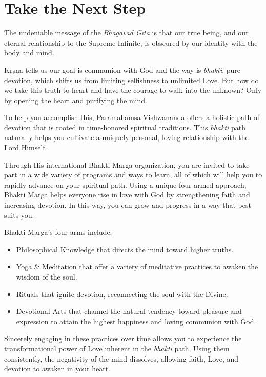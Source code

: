 \chapter*{Take the Next Step}\label{chap-take-the-next-step}

The undeniable message of the \textit{Bhagavad Gītā} is that our true being, and our eternal relationship to the Supreme Infinite, is obscured by our identity with the body and mind.

Kṛṣṇa tells us our goal is communion with God and the way is \textit{bhakti}, pure devotion, which shifts us from limiting selfishness to unlimited Love. But how do we take this truth to heart and have the courage to walk into the unknown? Only by opening the heart and purifying the mind. 

To help you accomplish this, Paramahamsa Vishwananda offers a holistic path of devotion that is rooted in time-honored spiritual traditions. This \textit{bhakti} path naturally helps you cultivate a uniquely personal, loving relationship with the Lord Himself.

Through His international Bhakti Marga organization, you are invited to take part in a wide variety of programs and ways to learn, all of which will help you to rapidly advance on your spiritual path. Using a unique four-armed approach, Bhakti Marga helps everyone rise in love with God by strengthening faith and increasing devotion. In this way, you can grow and progress in a way that best suits you.

Bhakti Marga's four arms include:
\begin{itemize}[itemsep=1pt, topsep=6pt]

\item Philosophical Knowledge that directs the
mind toward higher truths.

\item Yoga \& Meditation that offer a variety of
meditative practices to awaken the wisdom
of the soul.

\item Rituals that ignite devotion, reconnecting the
soul with the Divine.

\item Devotional Arts that channel the natural
tendency toward pleasure and expression
to attain the highest happiness and loving
communion with God.
\end{itemize}

Sincerely engaging in these practices over time allows you to experience the transformational power of Love inherent in the \textit{bhakti} path. Using them consistently, the negativity of the mind dissolves, allowing faith, Love, and devotion to awaken in your heart.


